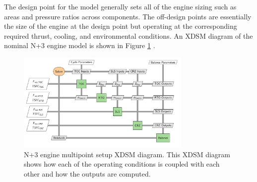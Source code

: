\documentclass[conf]{new-aiaa}
\begin{document}
The design point for the model generally sets all of the engine sizing such as areas and pressure ratios across components.
The off-design points are essentially the size of the engine at the design point but operating at the corresponding required thrust, cooling, and environmental conditions.
An XDSM diagram of the nominal N+3 engine model is shown in Figure \ref{fig:N3_xdsm} \cite{Hendricks2019}.

\begin{figure}[hbt!]
    \centering
    \includegraphics[width=0.75\textwidth]{N3_xdsm.pdf}
    \caption{
        N+3 engine multipoint setup XDSM diagram.
        This XDSM diagram shows how each of the operating conditions is coupled with each other and how the outputs are computed.
    }
    \label{fig:N3_xdsm}
\end{figure}
\end{document}
